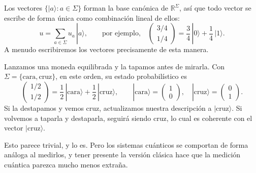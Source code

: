 \documentclass[11pt, a4paper, twoside, openright]{report}
\begin{document}
\noindent Los vectores $\{|a\rangle : a \in \Sigma\}$ forman la base canónica de $\mathbb{R}^\Sigma$, así que todo vector se escribe de forma única como combinación lineal de ellos:
\[ u = \sum_{a \in \Sigma} u_a\, |a\rangle, \qquad \text{por ejemplo,} \quad \begin{pmatrix} 3/4 \\ 1/4 \end{pmatrix} = \frac{3}{4}\,|0\rangle + \frac{1}{4}\,|1\rangle. \]
A menudo escribiremos los vectores precisamente de esta manera.

\begin{tcolorbox}[colback=cyan!5!white,colframe=cyan!75!black,title=\textbf{Ejemplo: La moneda tapada}]
Lanzamos una moneda equilibrada y la tapamos antes de mirarla. Con $\Sigma = \{\text{cara}, \text{cruz}\}$, en este orden, su estado probabilístico es
\[ \begin{pmatrix} 1/2 \\ 1/2 \end{pmatrix} = \frac{1}{2}\,|\text{cara}\rangle + \frac{1}{2}\,|\text{cruz}\rangle, \qquad |\text{cara}\rangle = \begin{pmatrix} 1 \\ 0 \end{pmatrix}, \quad |\text{cruz}\rangle = \begin{pmatrix} 0 \\ 1 \end{pmatrix}. \]
Si la destapamos y vemos cruz, actualizamos nuestra descripción a $|\text{cruz}\rangle$. Si volvemos a taparla y destaparla, seguirá siendo cruz, lo cual es coherente con el vector $|\text{cruz}\rangle$.

Esto parece trivial, y lo es. Pero los sistemas cuánticos se comportan de forma análoga al medirlos, y tener presente la versión clásica hace que la medición cuántica parezca mucho menos extraña.
\end{tcolorbox}
\end{document}
